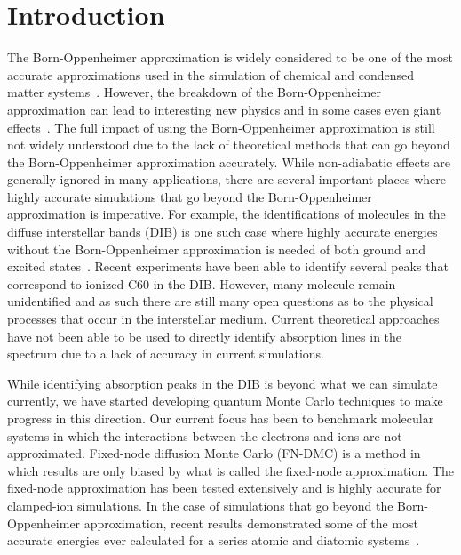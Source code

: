 \documentclass[aip,jcp,numerical,reprint]{revtex4-1}
\begin{document}
\section{Introduction}
The Born-Oppenheimer approximation is widely considered to be one of the most accurate approximations used in the simulation of chemical and condensed matter systems~\cite{Tubman_ECG,Yang2015,Martinez_Review,Cederbaum_Review,Sharon_NEO-HF,Sharon_XCNEO-HF1,Sharon_XCNEO-HF2,Sharon_XCNEO-HF,Kurt_XCNEO-HF,Kurt_XCNEO-HF1,Sharon_NEO-DFT,Sharon_NEO-DFT2,Sharon_NEO-DFT3,Gross_NEO-DFT,Gross_NEO-DFT1,Ilkka_Path,Ilkka_Path1,Ilkka_Path2}.  However, the breakdown of the Born-Oppenheimer approximation can lead to interesting new physics and in some cases even giant effects~\cite{saitta2008,giustino2016}. The full impact of using the Born-Oppenheimer approximation is still not widely understood due to the lack of theoretical methods that can go beyond the Born-Oppenheimer approximation accurately.  While non-adiabatic effects are generally ignored in many applications, there are several important places where highly accurate simulations that go beyond the Born-Oppenheimer approximation is imperative.  For example, the identifications of molecules in the diffuse interstellar bands (DIB) is one such case where highly accurate energies without the Born-Oppenheimer approximation is needed of both ground and excited states~\cite{snow2006}.   Recent experiments have been able to identify several peaks that correspond to ionized C60 in the DIB\cite{campbell2015}.  However, many molecule remain unidentified and as such there are still many open questions as to the physical processes that occur in the interstellar medium.  Current theoretical approaches have not been able to be used to directly identify absorption lines in the spectrum due to a lack of accuracy in current simulations.  

While identifying absorption peaks in the DIB is beyond what we can simulate currently, we have started developing quantum Monte Carlo techniques to make progress in this direction\cite{Tubman_ECG,Yang2015}.   Our current focus has been to benchmark molecular systems in which the interactions between the electrons and ions are not approximated.   Fixed-node diffusion Monte Carlo (FN-DMC) is a method in which results are only biased by what is called the fixed-node approximation.  %
The fixed-node approximation has been tested extensively and is highly accurate for clamped-ion simulations.  In the case of simulations that go beyond the Born-Oppenheimer approximation, recent results demonstrated some of the most accurate energies ever calculated for a series atomic and diatomic systems~\cite{Yang2015}.
\end{document}
